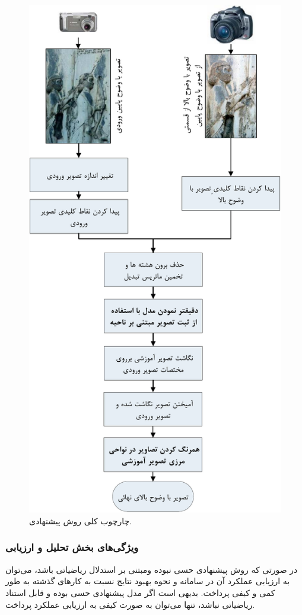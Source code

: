 \documentclass{CSICC}
\begin{document}
\begin{figure}[t]
\includegraphics[width=.9\linewidth]{Images/flowchar}
\caption{چارچوب کلی روش پیشنهادی.}
\label{fig:OneLRoneHR}
\end{figure}


\subsubsection{ویژگی‌های بخش تحلیل و ارزیابی}
در صورتی که روش پیشنهادی حسی نبوده ومبتنی بر استدلال ریاضیاتی باشد، می‌توان به ارزیابی عملکرد آن در سامانه و نحوه بهبود نتایج نسبت به کارهای گذشته به طور کمی و کیفی پرداخت. بدیهی است اگر مدل پیشنهادی حسی بوده و قابل استناد ریاضیاتی نباشد، تنها می‌توان به صورت کیفی به ارزیابی عملکرد پرداخت.
\end{document}
